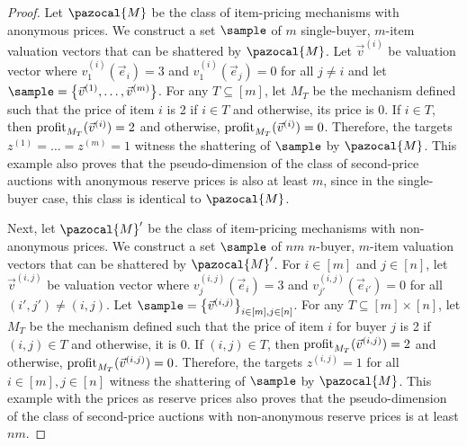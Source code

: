 \pdimLower*

\begin{proof}
Let $\pazocal{M}$ be the class of item-pricing mechanisms with anonymous prices. We construct a set $\sample$ of $m$ single-buyer, $m$-item valuation vectors that can be shattered by $\pazocal{M}$. Let $\vec{v}^{(i)}$ be valuation vector where $v_1^{(i)}(\vec{e}_i) = 3$ and $v_1^{(i)}(\vec{e}_j) = 0$ for all $j \not= i$ and let $\sample = \left\{\vec{v}^{(1)}, \dots, \vec{v}^{(m)}\right\}$. For any $T \subseteq [m]$, let $M_T$ be the mechanism defined such that the price of item $i$ is 2 if $i \in T$ and otherwise, its price is 0. If $i \in T$, then $\textnormal{profit}_{M_T}(\vec{v}^{(i)}) = 2$ and otherwise, $\textnormal{profit}_{M_T}(\vec{v}^{(i)}) = 0$. Therefore, the targets $z^{(1)} = \dots = z^{(m)} = 1$ witness the shattering of $\sample$ by $\pazocal{M}$. This example also proves that the pseudo-dimension of the class of second-price auctions with anonymous reserve prices is also at least $m$, since in the single-buyer case, this class is identical to $\pazocal{M}$.

Next, let $\pazocal{M}'$ be the class of item-pricing mechanisms with non-anonymous prices. We construct a set $\sample$ of $nm$ $n$-buyer, $m$-item valuation vectors that can be shattered by $\pazocal{M}'$. For $i \in [m]$ and $j \in [n]$, let $\vec{v}^{(i,j)}$ be valuation vector where $v_j^{(i,j)}(\vec{e}_i) = 3$ and $v_{j'}^{(i,j)}(\vec{e}_{i'}) = 0$ for all $(i', j') \not= (i,j)$. Let $\sample = \left\{\vec{v}^{(i,j)}\right\}_{i \in [m], j \in [n]}$. For any $T \subseteq [m] \times [n]$, let $M_T$ be the mechanism defined such that the price of item $i$ for buyer $j$ is 2 if $(i,j) \in T$ and otherwise, it is 0. If $(i,j) \in T$, then $\textnormal{profit}_{M_T}(\vec{v}^{(i,j)}) = 2$ and otherwise, $\textnormal{profit}_{M_T}(\vec{v}^{(i,j)}) = 0$. Therefore, the targets $z^{(i,j)} = 1$ for all $i\in [m], j \in [n]$ witness the shattering of $\sample$ by $\pazocal{M}$. This example with the prices as reserve prices also proves that the pseudo-dimension of the class of second-price auctions with non-anonymous reserve prices is at least $nm$.
\end{proof}